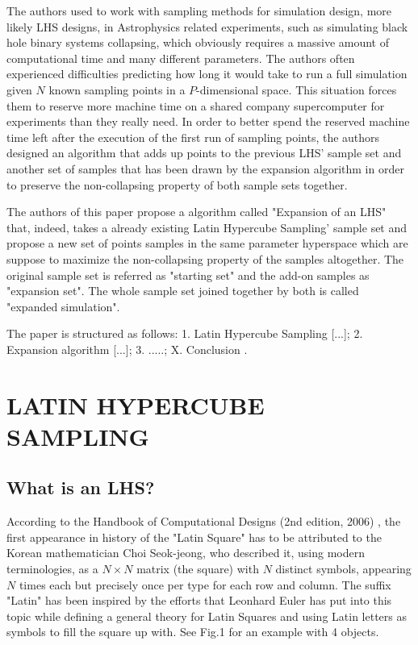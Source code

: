 \documentclass{article}
\begin{document}
The authors used to work with sampling methods for simulation design, more likely LHS designs, in Astrophysics related experiments, such as simulating black hole binary systems collapsing, which obviously requires a massive amount of computational time and many different parameters. The authors often experienced difficulties predicting how long it would take to run a full simulation given $N$ known sampling points in a $P$-dimensional space. This situation forces them to reserve more machine time on a shared company supercomputer for experiments than they really need. In order to better spend the reserved machine time left after the execution of the first run of sampling points, the authors designed an algorithm that adds up points to the previous LHS' sample set and another set of samples that has been drawn by the expansion algorithm in order to preserve the non-collapsing property of both sample sets together.

The authors of this paper propose a algorithm called "Expansion of an LHS" that, indeed, takes a already existing Latin Hypercube Sampling' sample set and propose a new set of points samples in the same parameter hyperspace which are suppose to maximize the non-collapsing property of the samples altogether. 
The original sample set is referred as "starting set" and the add-on samples as "expansion set". The whole sample set joined together by both is called "expanded simulation".

The paper is structured as follows: 1. Latin Hypercube Sampling [...]; 2. Expansion algorithm [...]; 3. .....; X. Conclusion .

\section{LATIN HYPERCUBE SAMPLING}
\subsection{What is an LHS? }
According to the Handbook of Computational Designs (2nd edition, 2006) , the first appearance in history of the "Latin Square" has to be attributed to the Korean mathematician Choi Seok-jeong, who described it, using modern terminologies, as a $N \times N$ matrix (the square) with $N$ distinct symbols, appearing $N$ times each but precisely once per type for each row and column. The suffix "Latin" has been inspired by the efforts that Leonhard Euler has put into this topic while defining a general theory for Latin Squares  and using Latin letters as symbols to fill the square up with. See Fig.1 for an example with 4 objects.
\end{document}
